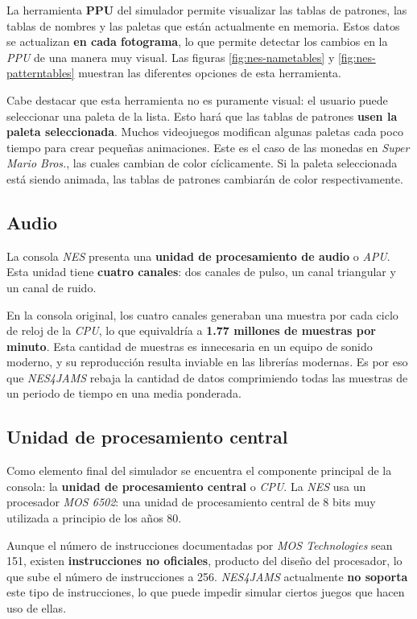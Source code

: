 La herramienta \textbf{PPU} del simulador permite
visualizar las tablas de patrones, las tablas de nombres
y las paletas que están actualmente en memoria.
Estos datos se actualizan \textbf{en cada fotograma},
lo que permite detectar los cambios en la \textit{PPU}
de una manera muy visual.
Las figuras \ref{fig:nes-nametables} y \ref{fig:nes-patterntables}
muestran las diferentes opciones de esta herramienta.

Cabe destacar que esta herramienta no es puramente visual:
el usuario puede seleccionar una paleta de la lista.
Esto hará que las tablas de patrones \textbf{usen la paleta seleccionada}.
Muchos videojuegos modifican algunas paletas cada poco tiempo
para crear pequeñas animaciones.
Este es el caso de las monedas en \textit{Super Mario Bros.}, las cuales
cambian de color cíclicamente.
Si la paleta seleccionada está siendo animada, las tablas de patrones
cambiarán de color respectivamente.

\subsection{Audio}\label{subsec:audio}

La consola \textit{NES} presenta
una \textbf{unidad de procesamiento de audio} o \textit{APU}\cite{APU}.
Esta unidad tiene \textbf{cuatro canales}: dos canales de pulso,
un canal triangular y un canal de ruido.

En la consola original, los cuatro canales generaban una muestra
por cada ciclo de reloj de la \textit{CPU}, lo que equivaldría
a \textbf{1.77 millones de muestras por minuto}.
Esta cantidad de muestras es innecesaria en un equipo de sonido
moderno, y su reproducción resulta inviable en las librerías
modernas.
Es por eso que \textit{NES4JAMS} rebaja la cantidad de datos comprimiendo
todas las muestras de un periodo de tiempo en una media ponderada.

\subsection{Unidad de procesamiento central}\label{subsec:unidad-de-procesamiento-central}

Como elemento final del simulador se encuentra el componente
principal de la consola: la \textbf{unidad de procesamiento central}
o \textit{CPU}.
La \textit{NES} usa un procesador \textit{MOS 6502}\cite{MOS6502}: una unidad
de procesamiento central de 8 bits muy utilizada a principio
de los años 80.

Aunque el número de instrucciones documentadas por \textit{MOS Technologies}
sean 151, existen \textbf{instrucciones no oficiales}, producto del diseño
del procesador, lo que sube el número de instrucciones a 256.
\textit{NES4JAMS} actualmente \textbf{no soporta} este tipo de instrucciones,
lo que puede impedir simular ciertos juegos que hacen uso de ellas.

